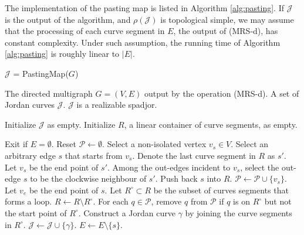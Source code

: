 \documentclass[a4paper]{article}
\newcommand{\cJ}{\mathcal{J}}
\begin{document}
The implementation of the pasting map is listed in Algorithm \ref{alg:pasting}. 
If $\cJ$ is the output of the algorithm, and $\rho(\cJ)$ is topological simple, 
we may assume that 
the processing of each curve segment in $E$, 
the output of (MRS-d), 
has constant complexity. 
Under such assumption, 
the running time of Algorithm \ref{alg:pasting} is roughly linear to $\vert E \vert$. 

\begin{algorithm}[htbp]
  \caption{$\cJ$ = PastingMap($G$)}
  \label{alg:pasting}
  \begin{algorithmic}[1]
    \renewcommand{\algorithmicrequire}{\textbf{Input : }}
    \REQUIRE The directed multigraph $G=(V,E)$ output by the operation (MRS-d). 
    \renewcommand{\algorithmicensure}{\textbf{Output : }}
    \ENSURE A set of Jordan curves $\cJ$.
    \renewcommand{\algorithmicensure}{\textbf{Postcondition : }}
    \ENSURE $\cJ$ is a realizable spadjor.

    \STATE Initialize $\cJ$ as empty.
    \STATE Initialize $R$, a linear container of curve segments, as empty.

    \STATE Exit if $E = \emptyset$.
    \STATE Reset $\mathcal{P} \leftarrow \emptyset$.
    \STATE Select a non-isolated vertex $v_s \in V$.
    Select an arbitrary edge $s$ that starts from $v_s$.
    \ELSE
    \STATE Denote the last curve segment in $R$ as $s'$.
    \STATE Let $v_s$ be the end point of $s'$.
    \STATE Among the out-edges incident to $v_s$,
    select the out-edge $s$ to be the clockwise neighbour of $s'$. 
    \ENDIF
    \STATE Push back $s$ into $R$.
    \STATE $\mathcal{P} \leftarrow \mathcal{P} \cup \{v_s\}$.
    \STATE Let $v_e$ be the end point of $s$.
    \STATE Let $R^{\circ} \subset R$ be the subset
    of curves segments that forms a loop.
    \STATE $R \leftarrow R \setminus R^{\circ}$.
    \STATE For each $q \in \mathcal{P}$, remove $q$ from $\mathcal{P}$
    if $q$ is on $R^{\circ}$ but not the start point of $R^{\circ}$.
    \STATE Construct a Jordan curve $\gamma$ by joining the curve segments in $R^{\circ}$.
    \STATE $\cJ \leftarrow \cJ \cup \{\gamma\}$.
    \ENDIF
    \STATE $E \leftarrow E \setminus \{s\}$. 
    \ENDWHILE
  \end{algorithmic}
\end{algorithm}
\end{document}
